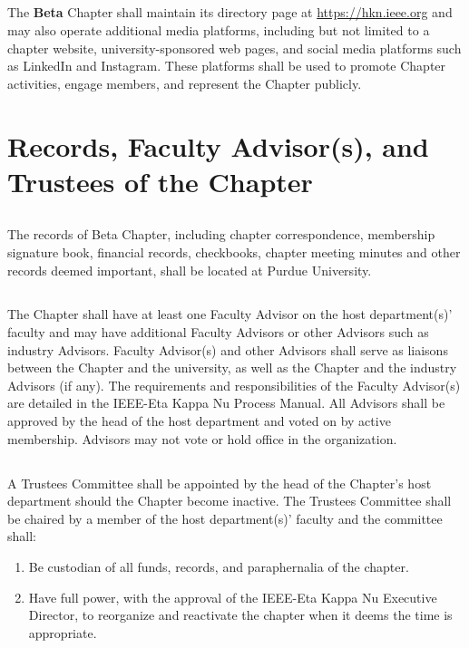 \documentclass[10pt, oneside]{article}
\begin{document}
\subsection{}

The \textbf{Beta} Chapter shall maintain its directory page at \url{https://hkn.ieee.org} and may also operate additional media platforms, including but not limited to a chapter website, university-sponsored web pages, and social media platforms such as LinkedIn and Instagram. These platforms shall be used to promote Chapter activities, engage members, and represent the Chapter publicly.

\section{Records, Faculty Advisor(s), and Trustees of the Chapter}
\subsection{}
The records of Beta Chapter, including chapter correspondence, membership signature book, financial records, checkbooks, chapter meeting minutes and other records deemed important, shall be located at Purdue University.
\subsection{}
The Chapter shall have at least one Faculty Advisor on the host department(s)’ faculty and may have additional Faculty Advisors or other Advisors such as industry Advisors.
Faculty Advisor(s) and other Advisors shall serve as liaisons between the Chapter and the university, as well as the Chapter and the industry Advisors (if any). The requirements and responsibilities of the Faculty Advisor(s) are detailed in the IEEE-Eta Kappa Nu Process Manual. All Advisors shall be approved by the head of the host department and voted on by active membership. Advisors may not vote or hold office in the organization.

\subsection{}
A Trustees Committee shall be appointed by the head of the Chapter’s host department should the Chapter become inactive. The Trustees Committee shall be chaired by a member of the host department(s)’ faculty and the committee shall:
\begin{enumerate}[label=\alph*.]
\item Be custodian of all funds, records, and paraphernalia of the chapter.
\item Have full power, with the approval of the IEEE-Eta Kappa Nu Executive
Director, to reorganize and reactivate the chapter when it deems the time is appropriate.
\end{enumerate}
\end{document}
